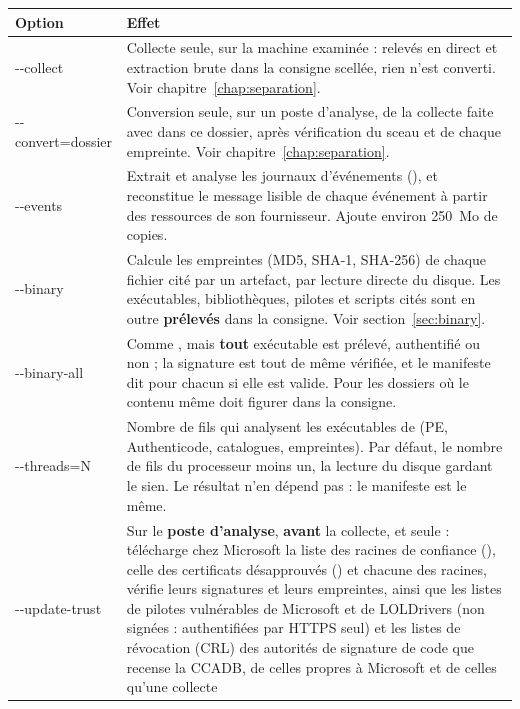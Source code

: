 \documentclass[11pt,a4paper,oneside]{report}
\begin{document}
\begin{longtable}{@{}>{\ttfamily}L{3.2cm}L{11.2cm}@{}}
\toprule
\normalfont\bfseries Option & \bfseries Effet \\
\midrule
\endhead
-{}-collect & Collecte seule, sur la machine examinée : relevés en direct et
  extraction brute dans la consigne scellée, rien n'est converti. Voir
  chapitre~\ref{chap:separation}. \\
-{}-convert=\newline dossier & Conversion seule, sur un poste d'analyse, de la collecte
  faite avec  dans ce dossier, après vérification du sceau et de
  chaque empreinte. Voir chapitre~\ref{chap:separation}. \\
-{}-events & Extrait et analyse les journaux d'événements (), et
  reconstitue le message lisible de chaque événement à partir des ressources de
  son fournisseur. Ajoute environ 250~Mo de copies. \\
-{}-binary & Calcule les empreintes (MD5, SHA-1, SHA-256) de chaque fichier cité
  par un artefact, par lecture directe du disque. Les exécutables, bibliothèques,
  pilotes et scripts cités sont en outre \textbf{prélevés} dans la consigne. Voir
  section~\ref{sec:binary}. \\
-{}-binary-all & Comme , mais \textbf{tout} exécutable est prélevé,
  authentifié ou non ; la signature est tout de même vérifiée, et le manifeste
  dit pour chacun si elle est valide. Pour les dossiers où le contenu même doit
  figurer dans la consigne. \\
-{}-threads=N & Nombre de fils qui analysent les exécutables de 
   (PE, Authenticode, catalogues, empreintes). Par défaut, le nombre
  de fils du processeur moins un, la lecture du disque gardant le sien. Le
  résultat n'en dépend pas : le manifeste est le même. \\
-{}-update-trust\newline [=dossier] & Sur le \textbf{poste d'analyse}, \textbf{avant} la collecte, et
  seule : télécharge chez Microsoft la liste des racines de confiance
  (), celle des certificats désapprouvés
  () et chacune des racines, vérifie leurs
  signatures et leurs empreintes, ainsi que les listes de pilotes vulnérables
  de Microsoft et de LOLDrivers (non signées : authentifiées par HTTPS seul)
  et les listes de révocation (CRL) des autorités de signature de code que
  recense la CCADB, de celles propres à Microsoft et de celles qu'une collecte

\end{longtable}
\end{document}
